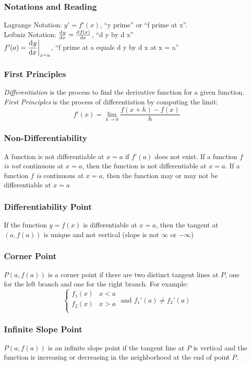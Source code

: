 \documentclass{article}
\begin{document}
	\subsubsection{Notations and Reading}
	Lagrange Notation: $y'=f'(x)$, ``y prime'' or ``f prime at x''.\\
	Leibniz Notation: $\od{y}{x}=\od{f(x)}{x}$, ``d y by d x''\\
	$f'(a)=\eval[3]{\dod{y}{x}}_{x=a}$, ``f prime at a equals d y by d x at x = a''
	\subsubsection{First Principles}
	\textit{Differentiation} is the process to find the derivative function for a given function.\\
	\textit{First Principles} is the process of differentiation by computing the limit:
	\[f'(x)=\lim_{h\to0}\frac{f(x+h)-f(x)}{h}\]
	\subsubsection{Non-Differentiability}
	A function is not differentiable at $x=a$ if $f'(a)$ does not exist. If a function $f$ \textit{is not} continuous at $x=a$, then the function is not differentiable at $x=a$. If a function $f$ \textit{is} continuous at $x=a$, then the function may or may not be differentiable at $x=a$
	\subsubsection{Differentiability Point}
	If the function $y=f(x)$ is differentiable at $x=a$, then the tangent at $(a, f(a))$ is unique and not vertical (slope is not $\infty$ or $-\infty$)
	\subsubsection{Corner Point}
	$P(a, f(a))$ is a corner point if there are two distinct tangent lines at $P$, one for the left branch and one for the right branch. For example: \[\begin{cases}
		f_1(x)&x<a\\
		f_2(x)&x>a\\
	\end{cases}\text{ and }f_1'(a)\neq f_2'(a)\]
	\subsubsection{Infinite Slope Point}
	$P(a, f(a))$ is an infinite slope point if the tangent line at $P$ is vertical and the function is increasing or decreasing in the neighborhood at the end of point $P$.
\end{document}
